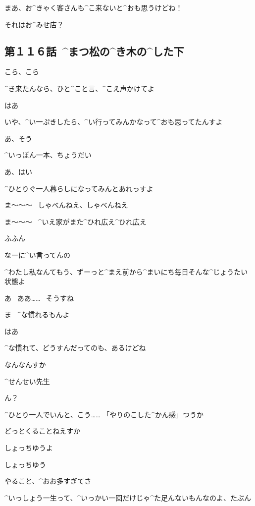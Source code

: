 \page
\Alpha まあ、お^{きゃく}{客}さんも^{こ}{来}ないと^{おも}{思}うけどね！

\Makki それはお^{みせ}{店}？


\subsection{第１１６話\ ^{まつ}{松}の^{き}{木}の^{した}{下}}

\page[79]
\Alpha こら、こら

\page
\Sensei ^{き}{来}たんなら、ひと^{こと}{言}、^{こえ}{声}かけてよ

\Ojisan はあ

\Ojisan いや、^{い}{一}ぷきしたら、^{い}{行}ってみんかなって^{おも}{思}ってたんすよ

\Sensei あ、そう

\Sensei ^{いっぽん}{一本}、ちょうだい

\Ojisan あ、はい

\page
\Ojisan ^{ひとりぐ}{一人暮}らしになってみんとあれっすよ

\Ojisan ま〜〜〜
\ しゃべんねえ、しゃべんねえ

\page
\Ojisan ま〜〜〜
\ ^{いえ}{家}がまた^{ひれ}{広}え^{ひれ}{広}え

\Sensei ふふん

\Sensei なーに^{い}{言}ってんの

\Sensei ^{わたし}{私}なんてもう、ずーっと^{まえ}{前}から^{まいにち}{毎日}そんな^{じょうたい}{状態}よ

\Ojisan あ
\ ああ……
\ そうすね

\page
\Sensei ま
\ ^{な}{慣}れるもんよ

\Ojisan はあ

\Sensei ^{な}{慣}れて、どうすんだってのも、あるけどね

\Ojisan なんなんすか

\page[85]
\Ojisan ^{せんせい}{先生}

\Sensei ん？

\Ojisan ^{ひとり}{一人}でいんと、こう……
「やりのこした^{かん}{感}」つうか

\Ojisan どっとくることねえすか

\Sensei しょっちゆうよ

\Ojisan しょっちゆう

\page
\Sensei やること、^{おお}{多}すぎてさ

\Sensei ^{いっしょう}{一生}って、^{いっかい}{一回}だけじゃ^{た}{足}んないもんなのよ、たぶん

